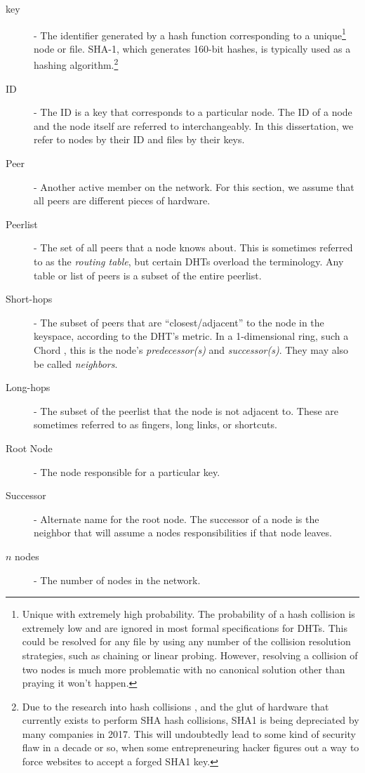 \begin{description}
    \item[key] -  The identifier generated by a hash function corresponding to a unique\footnote{Unique with extremely high probability.     The probability of a hash collision is extremely low and are ignored in most formal  specifications for DHTs.  This could be resolved for any file by using any number of the collision resolution strategies, such as chaining or linear probing.  However, resolving a collision of two nodes is much more problematic with no canonical solution other than praying it won't happen.} node or file.
    SHA-1, which generates 160-bit hashes, is typically used as a hashing algorithm.\footnote{Due to the research into hash collisions \cite{stevens2012attacks}, and the glut of hardware that currently exists to perform SHA hash collisions, SHA1 is being depreciated by many companies in 2017. This will undoubtedly lead to some kind of security flaw in a decade or so, when some entrepreneuring hacker figures out a way to force websites to accept a forged SHA1 key.}
    
	\item[ID] - The ID is a key that corresponds to a particular node.  
	The ID of a node and the node itself are referred to interchangeably.
	In this dissertation, we refer to nodes by their ID and files by their keys.
	\item[Peer]  - Another active member on the network.
	For this section, we assume that all peers are different pieces of hardware.
	\item[Peerlist] -  The set of all peers that a node knows about. 
	This is sometimes referred to as the \textit{routing table}, but certain DHTs  \cite{pastry} \cite{tapestry}  overload the terminology.
	Any table or list of peers is a subset of the entire peerlist.
	\item[Short-hops] - The subset of peers that are ``closest/adjacent'' to the node in the keyspace, according to the DHT's metric.  
	In a 1-dimensional ring, such a Chord \cite{chord}, this is the node's \textit{predecessor(s)} and \textit{successor(s)}.
	They may also be called \textit{neighbors}.
	\item[Long-hops] - The subset of the peerlist that the node is not adjacent to.  
	These are sometimes referred to as fingers, long links, or shortcuts.
	\item[Root Node] - The node responsible for a particular key. 
	\item[Successor] -  Alternate name for the root node. 
	The successor of a node is the neighbor that will assume a nodes responsibilities if that node leaves. 
    \item[$n$ nodes] -  The number of nodes in the network.
    
\end{description}
